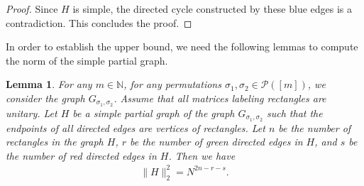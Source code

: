 \documentclass[10pt,a4paper]{amsart}
\numberwithin{equation}{section}
\theoremstyle{plain}
\newtheorem{lemma}[theorem]{Lemma}
\def\bN{\mathbb N}
\def\cP{\mathcal P}
\begin{document}
\begin{proof}
Since $H$ is simple, the directed cycle constructed by these blue edges is a contradiction. This concludes the proof.
\end{proof}

In order to establish the upper bound, we need the following lemmas to compute the norm of the simple partial graph.

\begin{lemma} \label{Lem-inner product}
For any $m \in \bN$, for any permutations $\sigma_1,\sigma_2 \in \cP([m])$, we consider the graph $G_{\sigma_1,\sigma_2}$. Assume that all matrices labeling rectangles are unitary. Let $H$ be a simple partial graph of the graph $G_{\sigma_1,\sigma_2}$ such that the endpoints of all directed edges are vertices of rectangles. Let $n$ be the number of rectangles in the graph $H$, $r$ be the number of green directed edges in $H$, and $s$ be the number of red directed edges in $H$. Then we have
\begin{align*}
    \|H\|_2^2 = N^{2n-r-s}.
\end{align*}
\end{lemma}
\end{document}
